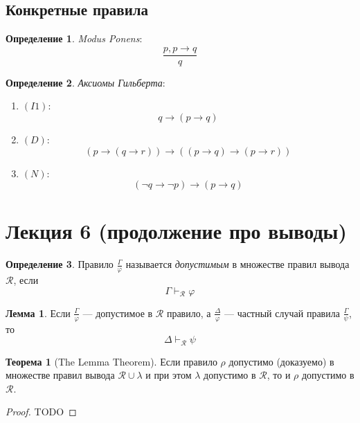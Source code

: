 \documentclass[12pt]{article}
\let\im\rightarrow
\let\n\neg
\let\un\cup
\theoremstyle{definition}
\newtheorem{definition}{Определение}[section]
\newtheorem{theorem}{Теорема}[section]
\theoremstyle{statement}
\theoremstyle{theorem}
\newtheorem{lemma}{Лемма}[section]
\begin{document}
\subsection{Конкретные правила}

\begin{definition}
  \textit{Modus Ponens}:
  \[
    \frac{p, p \im q}{q}
  \]
\end{definition}

\begin{definition}
  \textit{Аксиомы Гильберта}:
  \begin{enumerate}
    \item $(I1)$:
      \[
        q \im (p \im q)
      \]

    \item $(D)$:
      \[
        (p \im (q \im r)) \im ((p \im q) \im (p \im r))
      \]

    \item $(N)$:
      \[
        (\n q \im \n p) \im (p \im q)
      \]
  \end{enumerate}
\end{definition}

\pagebreak

\section{Лекция 6 (продолжение про выводы)}

\begin{definition}
  Правило $\frac{\Gamma}{\varphi}$ называется \textit{допустимым} в
  множестве правил вывода $\mathcal{R}$, если
  \begin{displaymath}
    \Gamma \vdash_{\mathcal{R}} \varphi
  \end{displaymath}
\end{definition}

\begin{lemma}
  Если $\frac{\Gamma}{\varphi}$ --- допустимое в $\mathcal{R}$
  правило, а $\frac{\Delta}{\varphi}$ --- частный случай правила
  $\frac{\Gamma}{\psi}$, то
  \begin{displaymath}
    \Delta \vdash_{\mathcal{R}} \psi
  \end{displaymath}
\end{lemma}

\begin{theorem}[The Lemma Theorem]
  Если правило $\rho$ допустимо (доказуемо) в множестве правил вывода
  $\mathcal{R} \un \lambda$ и при этом $\lambda$ допустимо в
  $\mathcal{R}$, то и $\rho$ допустимо в $\mathcal{R}$.
  \begin{proof}
    TODO
  \end{proof}
\end{theorem}
\end{document}
